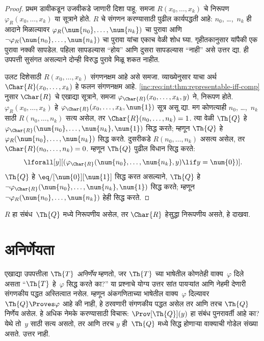 \begin{proof}
प्रथम डावीकडून उजवीकडे जाणारी दिशा पाहू. समजा
$R(x_0,\dots,x_k)$ चे निरूपण $\varphi_R(x_0,\dots,x_k)$ या
सूत्राने होते. $R$ चे संगणन करण्यासाठी पुढील कार्यपद्धती
आहे: $n_0$, \dots,~$n_k$ ही आदाने मिळाल्यावर
$\varphi_R(\num{n_0}, \dots, \num{n_k})$ चा पुरावा आणि
$\lnot \varphi_R(\num{n_0}, \dots, \num{n_k})$ चा पुरावा
यांचा एकाच वेळी शोध घ्या. गृहीतकानुसार यांपैकी एक पुरावा
नक्की सापडेल. पहिला सापडल्यास ``होय'' आणि दुसरा सापडल्यास
``नाही'' असे उत्तर द्या. ही उपपत्ती सुसंगत असल्याने दोन्ही
विरुद्ध पुरावे मिळू शकत नाहीत.

उलट दिशेसाठी $R(x_0, \dots, x_k)$ संगणनक्षम आहे असे समजा.
व्याख्येनुसार याचा अर्थ $\Char{R}(x_0, \dots, x_k)$ हे
फलन संगणनक्षम आहे. \ref{inc:req:int:thm:representable-iff-comp} नुसार
$\Char{R}$ चे एखाद्या सूत्राने, समजा
$\varphi_{\Char{R}}(x_0, \dots, x_k,
y)$ ने, निरूपण होते. $\varphi_R(x_0, \dots, x_k)$ हे
$\varphi_{\Char{R}}(x_0,
\dots, x_k, \num{1})$ सूत्र असू द्या. मग कोणत्याही
$n_0$, \dots,~$n_k$ साठी $R(n_0,
\dots, n_k)$ सत्य असेल, तर $\Char{R}(n_0, \dots, n_k) = 1$.
त्या वेळी $\Th{Q}$ हे
$\varphi_{\Char{R}}(\num{n_0}, \dots, \num{n_k},
\num{1})$ सिद्ध करते; म्हणून $\Th{Q}$ हे
$\varphi_R(\num{n_0}, \dots,
\num{n_k})$ सिद्ध करते. दुसरीकडे $R(n_0, \dots, n_k)$
असत्य असेल, तर $\Char{R}(n_0, \dots, n_k) = 0$.
म्हणून $\Th{Q}$ पुढील विधान सिद्ध करते:
\[\lforall[y][(\varphi_{\Char{R}}(\num{n_0}, \dots, \num{n_k}, y) \lif y =
  \num{0})].
\]
$\Th{Q}$ हे $\eq/[\num{0}][\num{1}]$ सिद्ध करत असल्याने,
$\Th{Q}$ हे $\lnot \varphi_{\Char{R}}(\num{n_0}, \dots, \num{n_k}, \num{1})$
सिद्ध करते; म्हणून $\lnot \varphi_R(\num{n_0}, \dots, \num{n_k})$
हेही सिद्ध करते.
\end{proof}

\begin{prob}
$R$ हा संबंध~$\Th{Q}$ मध्ये निरूपणीय असेल, तर
$\Char{R}$ हेसुद्धा निरूपणीय असते, हे दाखवा.
\end{prob}











\section{अनिर्णेयता}\label{inc:req:und:sec}

एखाद्या उपपत्तीला $\Th{T}$ \emph{अनिर्णेय} म्हणतो, जर $\Th{T}$ च्या
भाषेतील कोणतेही वाक्य~$\varphi$ दिले असता ``$\Th{T}$ हे~$\varphi$
सिद्ध करते का?'' या प्रश्नाचे योग्य उत्तर सांत पायऱ्यांत आणि
नेहमी देणारी संगणकीय पद्धत अस्तित्वात नसेल. म्हणून अंकगणिताच्या
भाषेतील वाक्य~$\varphi$ दिल्यावर $\Th{Q} \Proves \varphi$ आहे की नाही,
हे ठरवणारी संगणकीय पद्धत असेल तर आणि तरच $\Th{Q}$
निर्णेय असेल. हे अधिक नेमके करण्यासाठी विचारू: $\Prov[\Th{Q}](y)$
हा संबंध पुनरावर्ती आहे का? येथे तो~$y$ साठी सत्य
असतो, तर आणि तरच $y$ ही~$\Th{Q}$ मध्ये सिद्ध होणाऱ्या वाक्याची
गोडेल संख्या असते. उत्तर नाही.

